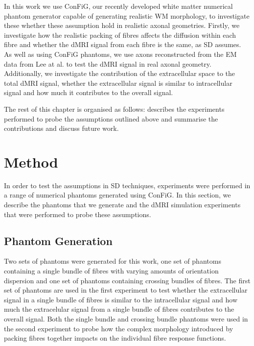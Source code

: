In this work we use \ac{ConFiG}, our recently developed white matter numerical phantom generator capable of generating realistic WM morphology, to investigate these whether these assumption hold in realistic axonal geometries.
Firstly, we investigate how the realistic packing of fibres affects the diffusion within each fibre and whether the dMRI signal from each fibre is the same, as \ac{SD} assumes.
As well as using \ac{ConFiG} phantoms, we use axons reconstructed from the \ac{EM} data from Lee at al. \cite{Lee2019b} to test the \ac{dMRI} signal in real axonal geometry.
Additionally, we investigate the contribution of the extracellular space to the total \ac{dMRI} signal, whether the extracellular signal is similar to intracellular signal and how much it contributes to the overall signal.

The rest of this chapter is organised as follows:  describes the experiments performed to probe the assumptions outlined above and  summarise the contributions and discuss future work.
\section{Method}
\label{sec:frf_method}
In order to test the assumptions in \ac{SD} techniques, experiments were performed in a range of numerical phantoms generated using ConFiG. In this section, we describe the phantoms that we generate and the \ac{dMRI} simulation experiments that were performed to probe these assumptions. 

\subsection{Phantom Generation}
\label{sec:frf_phantom_generation}
Two sets of phantoms were generated for this work, one set of phantoms containing a single bundle of fibres with varying amounts of orientation dispersion and one set of phantoms containing crossing bundles of fibres. The first set of phantoms are used in the first experiment to test whether the extracellular signal in a single bundle of fibres is similar to the intracellular signal and how much the extracelular signal from a single bundle of fibres contributes to the overall signal. Both the single bundle and crossing bundle phantoms were used in the second experiment to probe how the complex morphology introduced by packing fibres together impacts on the individual fibre response functions. 

